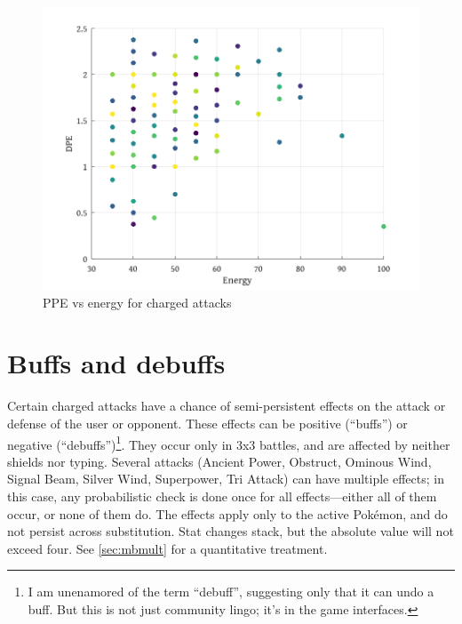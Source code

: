 \begin{figure}[ht]
\includegraphics[keepaspectratio,width=\textwidth]{octave/dpevse.png}
\caption{PPE vs energy for charged attacks}
\label{fig:dpevse}
\end{figure}

\section{Buffs and debuffs}
\label{sec:buffs}
Certain charged attacks have a chance of semi-persistent effects on the
  attack or defense of the user or opponent.
These effects can be positive (``buffs'') or negative (``debuffs'')\footnote{I am unenamored of the term ``debuff'',
  suggesting only that it can undo a buff. But this is not just community lingo; it's in the
  game interfaces.}.
They occur only in 3x3 battles, and are affected by neither shields nor typing.
Several attacks (Ancient Power, Obstruct, Ominous Wind, Signal Beam, Silver
  Wind, Superpower, Tri Attack) can have multiple effects; in this case, any
  probabilistic check is done once for all effects---either all of them
  occur, or none of them do.
The effects apply only to the active Pokémon, and do not persist across substitution.
Stat changes stack, but the absolute value will not exceed four.
See \autoref{sec:mbmult} for a quantitative treatment.

